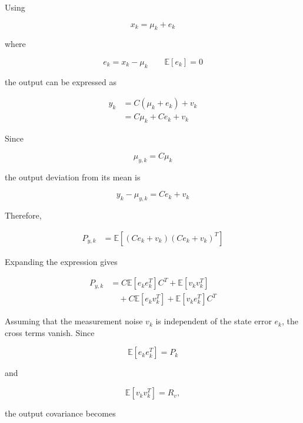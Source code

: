 Using

\begin{equation}
    x_k=\mu_k+e_k
\end{equation}

where

\begin{equation}
    e_k=x_k-\mu_k
    \qquad
    \mathbb{E}[e_k]=0
\end{equation}

the output can be expressed as

\begin{align}
    y_k
    &=
    C(\mu_k+e_k)+v_k \\
    &=
    C\mu_k+Ce_k+v_k
\end{align}

Since

\begin{equation}
    \mu_{y,k}=C\mu_k
\end{equation}

the output deviation from its mean is

\begin{equation}
    y_k-\mu_{y,k}
    =
    Ce_k+v_k
\end{equation}

Therefore,

\begin{align}
    P_{y,k}
    &=
    \mathbb{E}
    \left[
        (Ce_k+v_k)
        (Ce_k+v_k)^T
    \right]
\end{align}

Expanding the expression gives

\begin{align}
    P_{y,k}
    &=
    C
    \mathbb{E}[e_ke_k^T]
    C^T
    +
    \mathbb{E}[v_kv_k^T]
    \nonumber\\
    &\quad+
    C\mathbb{E}[e_kv_k^T]
    +
    \mathbb{E}[v_ke_k^T]C^T
\end{align}

Assuming that the measurement noise \(v_k\) is independent of the state error \(e_k\), the cross terms vanish. Since

\begin{equation}
    \mathbb{E}[e_ke_k^T]=P_k
\end{equation}

and

\begin{equation}
    \mathbb{E}[v_kv_k^T]=R_v,
\end{equation}

the output covariance becomes


